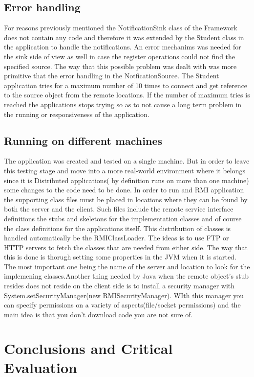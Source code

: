 \documentclass[a4paper,12pt,titlepage]{article}
\begin{document}
\subsection{Error handling}
For reasons previously mentioned the NotificationSink class of the Framework does not contain any code and therefore it was extended by the Student class in the application to handle the notifications. An error mechanims was needed for the sink side of view as well in case the register operations could not find the specified source. The way that this possible problem was dealt with was more primitive that the error handling in the NotficationSource. The Student application tries for a maximum number of 10 times to connect and get reference to the source object from the remote locations. If the number of maximum tries is reached the applications stops trying so as to not cause a long term problem in the running or responsiveness of the application.
\subsection{Running on different machines}
The application was created and tested on a single machine. But in order to leave this testing stage and move into a more real-world environment where it belongs since it is Distributed applications( by definition runs on more than one machine) some changes to the code need to be done. In order to run and RMI application the supporting class files must be placed in locations where they can be found by both the server and the client. Such files include the remote service interface definitions the stubs and skeletons for the implementation classes and of course the class definitions for the applications itself. This distribution of classes is handled automatically be the RMIClassLoader. The ideas is to use FTP or HTTP servers to fetch the classes that are needed from either side. The way that this is done is thorugh setting some properties in the JVM when it is started. The most important one being the name of the server and location to look for the implemening classes.Another thing needed by Java when the remote object's stub resides does not reside on the client side is to install a security manager with System.setSecurityManager(new RMISecurityManager). WIth this manager you can specify permissions on a variety of aspects(file/socket permissions) and the main idea is that you don't download code you are not sure of.
\section{Conclusions and Critical Evaluation}
\end{document}

